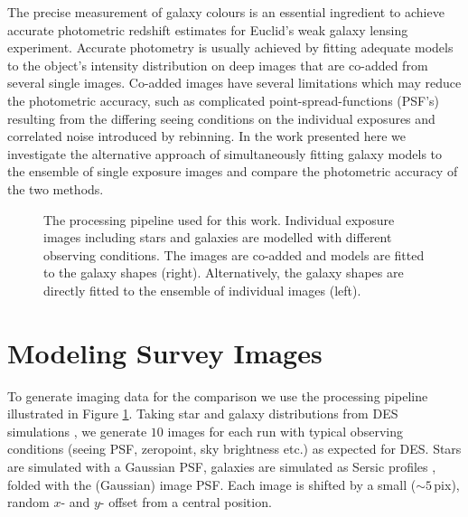 The precise measurement of galaxy colours is an essential ingredient to achieve accurate photometric redshift estimates for Euclid's weak galaxy lensing experiment. Accurate photometry is usually achieved by fitting adequate models to the object's intensity distribution on deep images that are co-added from several single images. Co-added images have several limitations which may reduce the photometric accuracy, such as complicated point-spread-functions (PSF's) resulting from the differing seeing conditions on the individual exposures and correlated noise introduced by rebinning. In the work presented here we investigate the alternative approach of simultaneously fitting galaxy models to the ensemble of single exposure images and compare the photometric accuracy of the two methods.

%
\begin{figure}[t]
\caption{The processing pipeline used for this work. Individual exposure images including stars and galaxies are modelled with different observing conditions. The images are co-added and models are fitted to the galaxy shapes (right). Alternatively, the galaxy shapes are directly fitted to the ensemble of individual images (left).}
\label{Kufig1}
\end{figure}
%
\section{Modeling Survey Images}
To generate imaging data for the comparison we use the processing pipeline illustrated in Figure \ref{Kufig1}. Taking star and galaxy distributions from DES simulations \citep{2010AAS...21547007L}, we generate $10$ images for each run with typical observing conditions (seeing PSF, zeropoint, sky brightness etc.) as expected for DES. Stars are simulated with a Gaussian PSF, galaxies are simulated as Sersic profiles \citep{1968adga.book.S}, folded with the (Gaussian) image PSF. Each image is shifted by a small ($\sim5$\,pix), random $x$- and $y$- offset from a central position.

